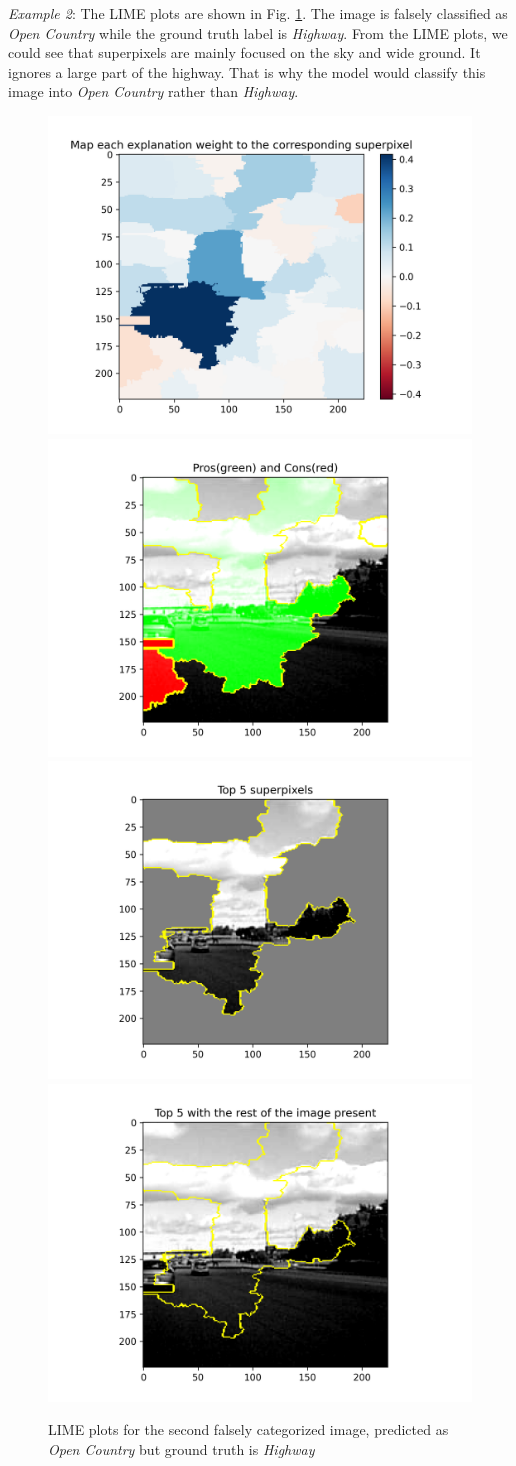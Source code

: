 \emph{Example 2}: The LIME plots are shown in Fig. \ref{fig:LIME_2}. The image is falsely classified as \emph{Open Country} while the ground truth label is \emph{Highway}. From the LIME plots, we could see that superpixels are mainly focused on the sky and wide ground. It ignores a large part of the highway. That is why the model would classify this image into \emph{Open Country} rather than \emph{Highway}.

\begin{figure}[htbp]
    \centering
    \includegraphics[width=0.49\linewidth]{lame_2_Map each explanation weight to the corresponding superpixel.png}
    \includegraphics[width=0.49\linewidth]{lame_2_Pros(green) and Cons(red).png}
    \includegraphics[width=0.49\linewidth]{lame_2_Top 5 superpixels.png}
    \includegraphics[width=0.49\linewidth]{lame_2_Top 5 with the rest of the image present.png}
    \caption{LIME plots for the second falsely categorized image, predicted as \emph{Open Country} but ground truth is \emph{Highway}}
    \label{fig:LIME_2}
\end{figure}

